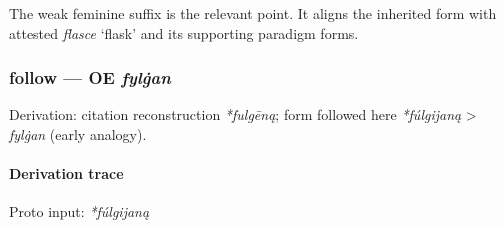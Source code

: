 \documentclass[
  british,
  a4paper,
]{article}
\begin{document}
The weak feminine suffix is the relevant point. It aligns the inherited
form with attested {\emph{flasce}} `flask' and its supporting paradigm
forms.

\subsubsection{\texorpdfstring{follow --- OE
\emph{fylġan}}{follow --- OE fylġan}}\label{follow-oe-fylux121an}

Derivation: citation reconstruction \emph{*fulgēną}; form followed here
\emph{*fúlgijaną} \textgreater{} \emph{fylġan} (early analogy).

\paragraph{Derivation trace}\label{derivation-trace-93}

Proto input: \emph{*fúlgijaną}

\begingroup
\setlength{\fboxsep}{6pt}
\end{document}
